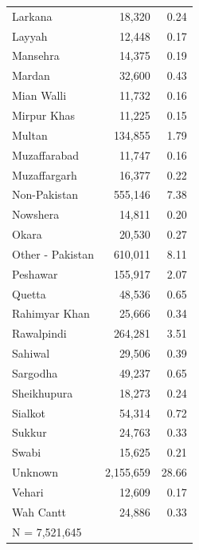 \begin{tabular}{lrr}
Larkana             &      18,320&        0.24\\
Layyah              &      12,448&        0.17\\
Mansehra            &      14,375&        0.19\\
Mardan              &      32,600&        0.43\\
Mian Walli          &      11,732&        0.16\\
Mirpur Khas         &      11,225&        0.15\\
Multan              &     134,855&        1.79\\
Muzaffarabad        &      11,747&        0.16\\
Muzaffargarh        &      16,377&        0.22\\
Non-Pakistan        &     555,146&        7.38\\
Nowshera            &      14,811&        0.20\\
Okara               &      20,530&        0.27\\
Other - Pakistan    &     610,011&        8.11\\
Peshawar            &     155,917&        2.07\\
Quetta              &      48,536&        0.65\\
Rahimyar Khan       &      25,666&        0.34\\
Rawalpindi          &     264,281&        3.51\\
Sahiwal             &      29,506&        0.39\\
Sargodha            &      49,237&        0.65\\
Sheikhupura         &      18,273&        0.24\\
Sialkot             &      54,314&        0.72\\
Sukkur              &      24,763&        0.33\\
Swabi               &      15,625&        0.21\\
Unknown             &   2,155,659&       28.66\\
Vehari              &      12,609&        0.17\\
Wah Cantt           &      24,886&        0.33\\
\midrule


\multicolumn{3}{l}{\footnotesize N =    7,521,645}\\


\bottomrule


\end{tabular}


